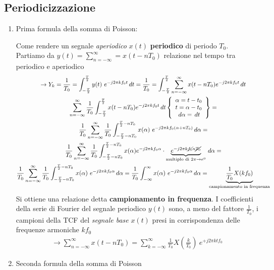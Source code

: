 \documentclass[
  paper=a4,
  ,captions=tableheading
]{scrartcl}
\begin{document}
\subsection{Periodicizzazione}\label{periodicizzazione}

\begin{enumerate}
\def\labelenumi{\arabic{enumi}.}
\setcounter{enumi}{23}
\item
  Prima formula della somma di Poisson:

  Come rendere un segnale \emph{aperiodico} \(x(t)\) \textbf{periodico}
  di periodo \(T_0\). Partiamo da
  \(y(t)=\sum_{n=-\infty}^{\infty} = x(t-nT_0)\) relazione nel tempo tra
  periodico e aperiodico \begin{gather*}
  \to Y_k = \frac{1}{T_0} = \int_{-\frac{T}{2}}^{\frac{T}{2}} y(t) \ e^{-j2 \pi kf_{0}t} \,dt = \frac{1}{T_0} = \int_{-\frac{T}{2}}^{\frac{T}{2}} \sum_{n=-\infty}^{\infty} x(t-nT_0) e^{-j2\pi kf_{0}t} \,dt \\
  \sum_{n=-\infty}^{\infty}\frac{1}{T_0} \int_{-\frac{T}{2}}^{\frac{T}{2}} x(t-nT_0)e^{-j2\pi kf_{0}t} \,dt \left\{ \begin{array}{cl} \alpha = t-t_0 \\ t = \alpha -t_0 \\ \,d\alpha = \,dt \end{array}\right\} = \\
  \frac{1}{T_0} \sum_{n=-\infty}^{\infty}\frac{1}{T_0} \int_{-\frac{T}{2}-nT_0}^{\frac{T}{2}-nT_0} x(\alpha) \ e^{-j2\pi kf_{0}(\alpha +nT_0)} \,d\alpha = \\
  \frac{1}{T_0} \sum_{n=-\infty}^{\infty}\frac{1}{T_0} \int_{-\frac{T}{2}-nT_0}^{\frac{T}{2}-nT_0} x(\alpha) e^{-j2\pi kf_{0}\alpha} \cdot \underbrace{e^{-j2\pi k\cancel{f_0}n\cancel{T_0}}}_{\text{multiplo di }2\pi \to e^{0}} \,d\alpha= \\
  \frac{1}{T_0} \sum_{n=-\infty}^{\infty}\frac{1}{T_0} \int_{-\frac{T}{2}-nT_0}^{\frac{T}{2}-nT_0} x(\alpha) \ e^{-j2\pi kf_{0}\alpha} \,d\alpha =
  \frac{1}{T_0} \int_{-\infty}^{\infty}x(\alpha) \ e^{-j2\pi kf_{0}\alpha}\,d\alpha = \underbrace{\frac{1}{T_0}X(kf_0)}_{\text{campionamento in frequenza}}
  \end{gather*} Si ottiene una relazione detta \textbf{campionamento in
  frequenza}. I coefficienti della serie di Fourier del segnale
  periodico \(y(t)\) sono, a meno del fattore \(\frac{1}{T_0}\), i
  campioni della TCF del \emph{segnale base} \(x(t)\) presi in
  corrispondenza delle frequenze armoniche \(kf_0\) \begin{gather*}
  \to \sum_{n=-\infty}^{\infty}x(t-nT_0) = \sum_{k=-\infty}^{\infty} \frac{1}{T_0} X(\frac{k}{T_0})\ e^{+j2\pi kt f_0}
  \end{gather*}
\item
  Seconda formula della somma di Poisson


\end{enumerate}
\end{document}

